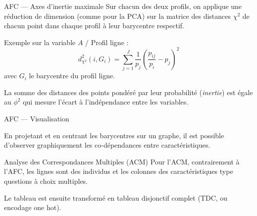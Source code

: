 \begin{frame}{AFC --- Axes d'inertie maximale}
  Sur chacun des deux profils, on applique une réduction de dimension (comme pour la PCA) sur la matrice des distances $\chi^2$ de chacun point dans chaque profil à leur barycentre respectif.

  Exemple sur la variable $A$ / Profil ligne :
  \begin{equation*}
    d_{\chi^2}^2(i,G_i) = \sum^J_{j=1}\frac{1}{p_j}\left(\frac{p_{ij}}{p_i} - p_j \right)^2 
  \end{equation*}
  avec $G_i$ le barycentre du profil ligne.

  La somme des distances des points pondéré par leur probabilité (\emph{inertie}) est égale au $\phi^2$ qui mesure l'écart à l'indépendance entre les variables.
\end{frame}

\begin{frame}{AFC --- Visualisation}
  \begin{minipage}{0.59\linewidth}
  \end{minipage}
  \begin{minipage}{0.4\linewidth}
    En projetant et en centrant les barycentres sur un graphe, il est possible d'observer graphiquement les co-dépendances entre caractéristiques.
  \end{minipage}
\end{frame}

\begin{frame}{Analyse des Correspondances Multiples (ACM)}
  Pour l'ACM, contrairement à l'AFC, les lignes sont des individus et les colonnes des caractéristiques type questions à choix multiples.
  \begin{center}
  \end{center}
  Le tableau est ensuite transformé en tableau disjonctif complet (TDC, ou encodage one hot).
\end{frame}

